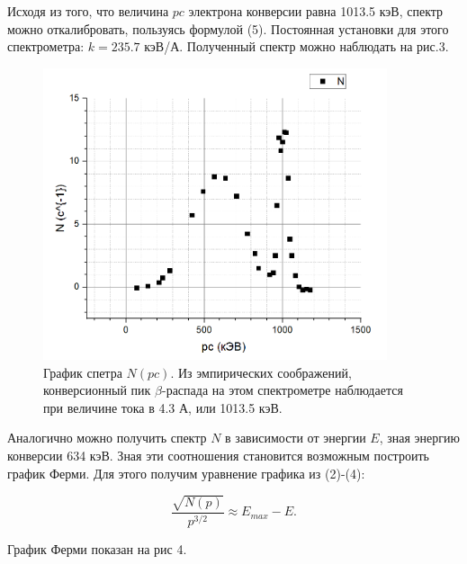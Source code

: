 \documentclass[a4paper, 14pt]{extarticle}%
\newcommand\ECaption[1]{%
     \captionsetup{font=footnotesize}%
     \caption{#1}}
\begin{document}
Исходя из того, что величина $pc$ электрона конверсии равна 1013.5 кэВ, спектр можно откалибровать, пользуясь формулой (5). Постоянная установки для этого спектрометра: $k=235.7$ кэВ/А.
Полученный спектр можно наблюдать на рис.3. 

\begin{figure}[h]
\begin{center}
\includegraphics[width=0.9\textwidth]{gr1}
\ECaption{График спетра $N(pc)$. Из эмпирических соображений, конверсионный пик $\beta$-распада на этом спектрометре наблюдается при величине тока в 4.3 А, или 1013.5 кэВ.}
\end{center}
\end{figure}

Аналогично можно получить спектр $N$ в зависимости от энергии $E$, зная энергию конверсии 634 кэВ. Зная эти соотношения становится возможным построить график Ферми. Для этого получим уравнение графика из (2)-(4):

\begin{equation}
\frac{\sqrt{N(p)}}{p^{3/2}} \approx E_{max} - E.
\end{equation}

График Ферми показан на рис 4.
\end{document}
